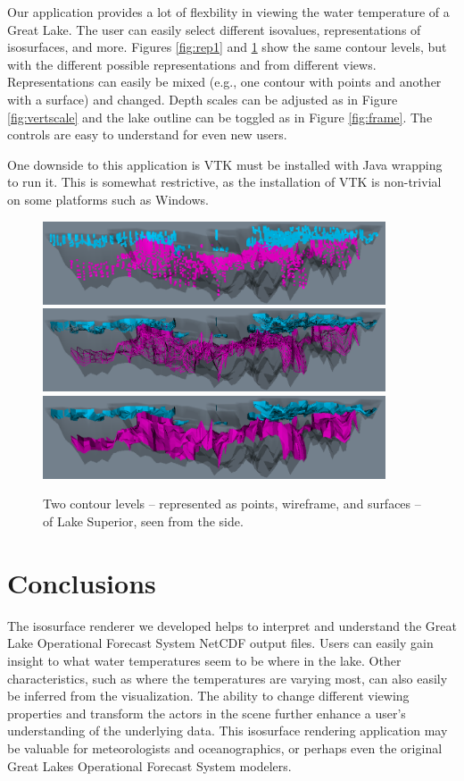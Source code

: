 \documentclass{article} %
\begin{document}
Our application provides a lot of flexbility in viewing the water temperature of a Great Lake.  The user can easily select different isovalues, representations of isosurfaces, and more.  Figures \ref{fig:rep1} and \ref{fig:rep2} show the same contour levels, but with the different possible representations and from different views.  Representations can easily be mixed (e.g., one contour with points and another with a surface) and changed.  Depth scales can be adjusted as in Figure \ref{fig:vertscale} and the lake outline can be toggled as in Figure \ref{fig:frame}.  The controls are easy to understand for even new users.  

One downside to this application is VTK must be installed with Java wrapping to run it.  This is somewhat restrictive, as the installation of VTK is non-trivial on some platforms such as Windows.

\begin{figure}[htb]
   \centering
   \includegraphics[width=4in]{figures/points2.eps}
   \includegraphics[width=4in]{figures/wireframe2.eps}
   \includegraphics[width=4in]{figures/surface2.eps}
    \caption{Two contour levels -- represented as points, wireframe, and surfaces -- of Lake Superior, seen from the side.}
   \label{fig:rep2}
\end{figure}

\section{Conclusions}

The isosurface renderer we developed helps to interpret and understand the Great Lake Operational Forecast System NetCDF output files.  Users can easily gain insight to what water  temperatures seem to be where in the lake.  Other characteristics, such as where the temperatures are varying most, can also easily be inferred from the visualization.  The ability to change different viewing properties and transform the actors in the scene further enhance a user's understanding of the underlying data. This isosurface rendering application may be valuable for meteorologists and oceanographics, or perhaps even the original Great Lakes Operational Forecast System modelers.
\end{document}
